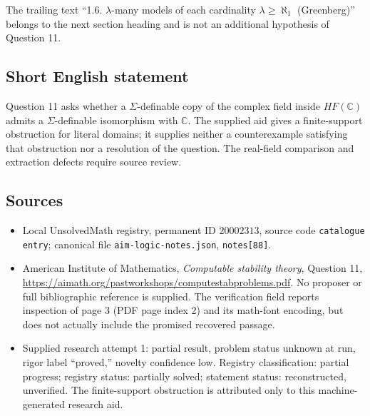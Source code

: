 \documentclass[11pt]{article}
\newcommand{\C}{\mathbb{C}}
\begin{document}
The trailing text ``1.6. $\lambda$-many models of each cardinality $\lambda\geq\aleph_1$ (Greenberg)'' belongs to the next section heading and is not an additional hypothesis of Question 11.
\subsection{Short English statement}
Question 11 asks whether a $\Sigma$-definable copy of the complex field inside $HF(\C)$ admits a $\Sigma$-definable isomorphism with $\C$. The supplied aid gives a finite-support obstruction for literal domains; it supplies neither a counterexample satisfying that obstruction nor a resolution of the question. The real-field comparison and extraction defects require source review.
\subsection{Sources}
\begin{itemize}
\item Local UnsolvedMath registry, permanent ID $20002313$, source code \texttt{catalogue entry}; canonical file \texttt{aim-logic-notes.json}, \texttt{notes[88]}.
\item American Institute of Mathematics, \emph{Computable stability theory}, Question 11, \url{https://aimath.org/pastworkshops/computestabproblems.pdf}. No proposer or full bibliographic reference is supplied. The verification field reports inspection of page 3 (PDF page index 2) and its math-font encoding, but does not actually include the promised recovered passage.
\item Supplied research attempt 1: partial result, problem status unknown at run, rigor label ``proved,'' novelty confidence low. Registry classification: partial progress; registry status: partially solved; statement status: reconstructed, unverified. The finite-support obstruction is attributed only to this machine-generated research aid.
\end{itemize}
\end{document}
